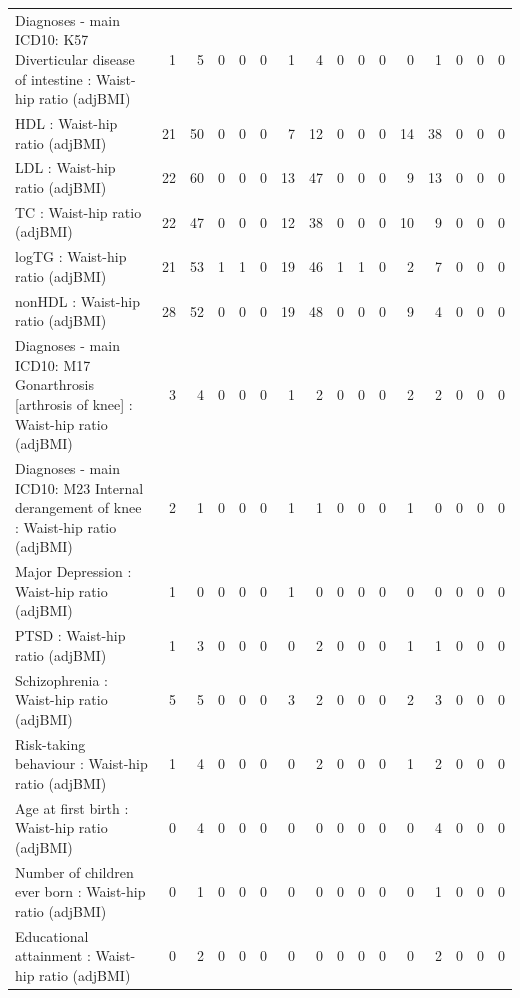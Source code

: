 \begin{table}[ht]
\begin{tabular}{lrrrrrrrrrrrrrrr}
  Diagnoses - main ICD10: K57 Diverticular disease of intestine : Waist-hip ratio (adjBMI) &   1 &   5 &   0 &   0 &   0 &   1 &   4 &   0 &   0 &   0 &   0 &   1 &   0 &   0 &   0 \\ 
  HDL : Waist-hip ratio (adjBMI) &  21 &  50 &   0 &   0 &   0 &   7 &  12 &   0 &   0 &   0 &  14 &  38 &   0 &   0 &   0 \\ 
  LDL : Waist-hip ratio (adjBMI) &  22 &  60 &   0 &   0 &   0 &  13 &  47 &   0 &   0 &   0 &   9 &  13 &   0 &   0 &   0 \\ 
  TC : Waist-hip ratio (adjBMI) &  22 &  47 &   0 &   0 &   0 &  12 &  38 &   0 &   0 &   0 &  10 &   9 &   0 &   0 &   0 \\ 
  logTG : Waist-hip ratio (adjBMI) &  21 &  53 &   1 &   1 &   0 &  19 &  46 &   1 &   1 &   0 &   2 &   7 &   0 &   0 &   0 \\ 
  nonHDL : Waist-hip ratio (adjBMI) &  28 &  52 &   0 &   0 &   0 &  19 &  48 &   0 &   0 &   0 &   9 &   4 &   0 &   0 &   0 \\ 
  Diagnoses - main ICD10: M17 Gonarthrosis [arthrosis of knee] : Waist-hip ratio (adjBMI) &   3 &   4 &   0 &   0 &   0 &   1 &   2 &   0 &   0 &   0 &   2 &   2 &   0 &   0 &   0 \\ 
  Diagnoses - main ICD10: M23 Internal derangement of knee : Waist-hip ratio (adjBMI) &   2 &   1 &   0 &   0 &   0 &   1 &   1 &   0 &   0 &   0 &   1 &   0 &   0 &   0 &   0 \\ 
  Major Depression : Waist-hip ratio (adjBMI) &   1 &   0 &   0 &   0 &   0 &   1 &   0 &   0 &   0 &   0 &   0 &   0 &   0 &   0 &   0 \\ 
  PTSD : Waist-hip ratio (adjBMI) &   1 &   3 &   0 &   0 &   0 &   0 &   2 &   0 &   0 &   0 &   1 &   1 &   0 &   0 &   0 \\ 
  Schizophrenia : Waist-hip ratio (adjBMI) &   5 &   5 &   0 &   0 &   0 &   3 &   2 &   0 &   0 &   0 &   2 &   3 &   0 &   0 &   0 \\ 
  Risk-taking behaviour : Waist-hip ratio (adjBMI) &   1 &   4 &   0 &   0 &   0 &   0 &   2 &   0 &   0 &   0 &   1 &   2 &   0 &   0 &   0 \\ 
  Age at first birth  : Waist-hip ratio (adjBMI) &   0 &   4 &   0 &   0 &   0 &   0 &   0 &   0 &   0 &   0 &   0 &   4 &   0 &   0 &   0 \\ 
  Number of children ever born  : Waist-hip ratio (adjBMI) &   0 &   1 &   0 &   0 &   0 &   0 &   0 &   0 &   0 &   0 &   0 &   1 &   0 &   0 &   0 \\ 
  Educational attainment : Waist-hip ratio (adjBMI) &   0 &   2 &   0 &   0 &   0 &   0 &   0 &   0 &   0 &   0 &   0 &   2 &   0 &   0 &   0 \\ 

\end{tabular}
\end{table}
